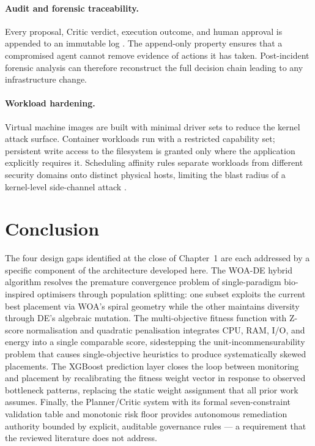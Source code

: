 \documentclass[12pt,a4paper]{report}
\begin{document}
\paragraph{Audit and forensic traceability.}
Every proposal, Critic verdict, execution outcome, and human approval is appended
to an immutable log \cite{gu2023towards, saxena2022secure}. The append-only property
ensures that a compromised agent cannot remove evidence of actions it has taken.
Post-incident forensic analysis can therefore reconstruct the full decision chain
leading to any infrastructure change.

\paragraph{Workload hardening.}
Virtual machine images are built with minimal driver sets to reduce the kernel attack
surface. Container workloads run with a restricted capability set; persistent
write access to the filesystem is granted only where the application explicitly
requires it. Scheduling affinity rules separate workloads from different security
domains onto distinct physical hosts, limiting the blast radius of a kernel-level
side-channel attack \cite{saxena2022secure}.

\section{Conclusion}

The four design gaps identified at the close of Chapter~1 are each addressed by a
specific component of the architecture developed here. The WOA-DE hybrid algorithm
resolves the premature convergence problem of single-paradigm bio-inspired
optimisers through population splitting: one subset exploits the current best
placement via WOA's spiral geometry while the other maintains diversity through
DE's algebraic mutation. The multi-objective fitness function with Z-score
normalisation and quadratic penalisation integrates CPU, RAM, I/O, and energy into
a single comparable score, sidestepping the unit-incommensurability problem that
causes single-objective heuristics to produce systematically skewed placements.
The XGBoost prediction layer closes the loop between monitoring and placement by
recalibrating the fitness weight vector in response to observed bottleneck patterns,
replacing the static weight assignment that all prior work assumes. Finally, the
Planner/Critic system with its formal seven-constraint validation table and monotonic
risk floor provides autonomous remediation authority bounded by explicit, auditable
governance rules --- a requirement that the reviewed literature does not address.
\end{document}
